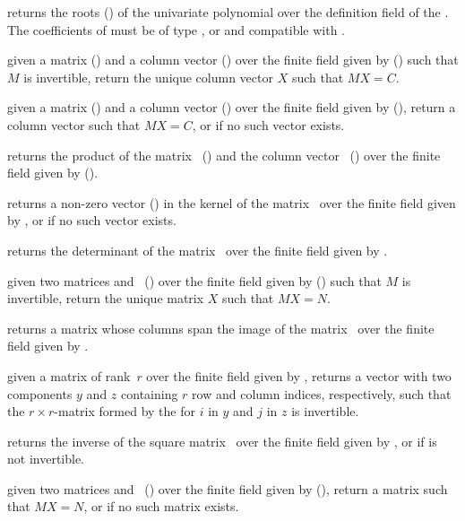  returns the roots ()
of the univariate polynomial  over the definition field of the
 . The coefficients of  must be of type ,
 or  and compatible with .

 given a matrix 
() and a column vector  () over the finite
field given by  () such that $M$ is invertible,
return the unique column vector $X$ such that $MX=C$.

 given a matrix
 () and a column vector  () over the
finite field given by  (), return a column vector
 such that $MX=C$, or  if no such vector exists.

 returns the product of
the matrix~ () and the column vector~
() over the finite field given by  ().

 returns a non-zero vector
() in the kernel of the matrix~ over the finite field
given by , or  if no such vector exists.

 returns the determinant of the
matrix~ over the finite field given by .

 given two matrices 
and~ () over the finite field given by 
() such that $M$ is invertible, return the unique matrix
$X$ such that $MX=N$.

 returns a matrix whose columns
span the image of the matrix~ over the finite field given by
.

 given a matrix  of
rank~$r$ over the finite field given by , returns a vector
with two  components $y$ and $z$ containing $r$ row and
column indices, respectively, such that the $r\times r$-matrix formed
by the  for $i$ in $y$ and $j$ in $z$ is invertible.

 returns the inverse of the square
matrix~ over the finite field given by , or 
if  is not invertible.

 given two matrices
 and~ () over the finite field given by
 (), return a matrix  such that $MX=N$, or
 if no such matrix exists.

